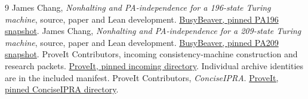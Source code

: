 \documentclass[11pt,a4paper]{article}
\begin{document}
\begin{thebibliography}{9}
 James Chang, \emph{Nonhalting and PA-independence for a
196-state Turing machine}, source, paper and Lean development.
\href{https://github.com/jamesyc/BusyBeaver/tree/407cdc356f6b586635e71ac92be394255f4bfea4}{BusyBeaver, pinned PA196 snapshot}.
 James Chang, \emph{Nonhalting and PA-independence for a
209-state Turing machine}, source, paper and Lean development.
\href{https://github.com/jamesyc/BusyBeaver/tree/69d98241a721ead20b4f0b17df9062950b40fbfe}{BusyBeaver, pinned PA209 snapshot}.
 ProveIt Contributors, incoming consistency-machine
construction and research packets.
\href{https://github.com/VladimirReshetnikov/ProveIt/tree/239b7a406e24405d464edc526e09d402abce5bc5/docs/incoming}{ProveIt, pinned incoming directory}.
Individual archive identities are in the included manifest.
 ProveIt Contributors, \emph{ConciseIPRA}.
\href{https://github.com/VladimirReshetnikov/ProveIt/tree/239b7a406e24405d464edc526e09d402abce5bc5/Logic/PrimitiveRecursiveArithmetic/ConciseIPRA}{ProveIt, pinned ConciseIPRA directory}.
\end{thebibliography}
\end{document}
